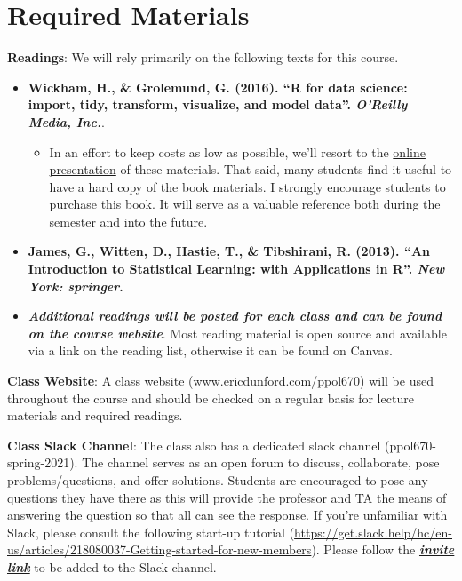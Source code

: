 \documentclass[
  12pt,
]{article}
\providecommand{\tightlist}{%
  \setlength{\itemsep}{0pt}\setlength{\parskip}{0pt}}
\begin{document}
\hypertarget{required-materials}{%
\section{Required Materials}\label{required-materials}}

\textbf{Readings}: We will rely primarily on the following texts for
this course.

\begin{itemize}
\item
  \textbf{Wickham, H., \& Grolemund, G. (2016). ``R for data science:
  import, tidy, transform, visualize, and model data''. \emph{O'Reilly
  Media, Inc.}}.

  \begin{itemize}
  \tightlist
  \item
    In an effort to keep costs as low as possible, we'll resort to the
    \href{https://r4ds.had.co.nz/}{online presentation} of these
    materials. That said, many students find it useful to have a hard
    copy of the book materials. I strongly encourage students to
    purchase this book. It will serve as a valuable reference both
    during the semester and into the future.
  \end{itemize}
\item
  \textbf{James, G., Witten, D., Hastie, T., \& Tibshirani, R. (2013).
  ``An Introduction to Statistical Learning: with Applications in R''.
  \emph{New York: springer}.}
\item
  \textbf{\emph{Additional readings will be posted for each class and
  can be found on the course website}}. Most reading material is open
  source and available via a link on the reading list, otherwise it can
  be found on Canvas.
\end{itemize}

\textbf{Class Website}: A class website (www.ericdunford.com/ppol670)
will be used throughout the course and should be checked on a regular
basis for lecture materials and required readings.

\textbf{Class Slack Channel}: The class also has a dedicated slack
channel (ppol670-spring-2021). The channel serves as an open forum to
discuss, collaborate, pose problems/questions, and offer solutions.
Students are encouraged to pose any questions they have there as this
will provide the professor and TA the means of answering the question so
that all can see the response. If you're unfamiliar with Slack, please
consult the following start-up tutorial
(\url{https://get.slack.help/hc/en-us/articles/218080037-Getting-started-for-new-members}).
Please follow the
\href{https://join.slack.com/t/ppol670-spring-2021/shared_invite/zt-ku5h37xj-rN4y~pXDnQeV4YFNXsf9pw}{\textbf{\emph{invite
link}}} to be added to the Slack channel.
\end{document}
